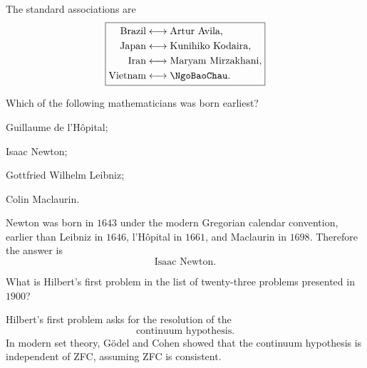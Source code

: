     \begin{solution}
        The standard associations are
        \[
            \boxed{
                \begin{aligned}
                    \text{Brazil}
                    &\longleftrightarrow \text{Artur Avila},\\
                    \text{Japan}
                    &\longleftrightarrow \text{Kunihiko Kodaira},\\
                    \text{Iran}
                    &\longleftrightarrow \text{Maryam Mirzakhani},\\
                    \text{Vietnam}
                    &\longleftrightarrow \text{\NgoBaoChau}.
                \end{aligned}
            }
        \]
    \end{solution}




    \begin{expectedproblem}
        Which of the following mathematicians was born earliest?
        \begin{problemchoices}
            \item Guillaume de l'H\^opital;
            \item Isaac Newton;
            \item Gottfried Wilhelm Leibniz;
            \item Colin Maclaurin.
        \end{problemchoices}
    \end{expectedproblem}

    \begin{solution}
        Newton was born in $1643$ under the modern Gregorian calendar
        convention, earlier than Leibniz in $1646$, l'H\^opital in $1661$, and
        Maclaurin in $1698$. Therefore the answer is
        \[
            \boxed{\text{Isaac Newton}}.
        \]
    \end{solution}

    \begin{expectedproblem}
        What is Hilbert's first problem in the list of twenty-three problems
        presented in $1900$?
    \end{expectedproblem}

    \begin{solution}
        Hilbert's first problem asks for the resolution of the
        \[
            \boxed{\text{continuum hypothesis}}.
        \]
        In modern set theory, Gödel and Cohen showed that the continuum
        hypothesis is independent of ZFC, assuming ZFC is consistent.
    \end{solution}

